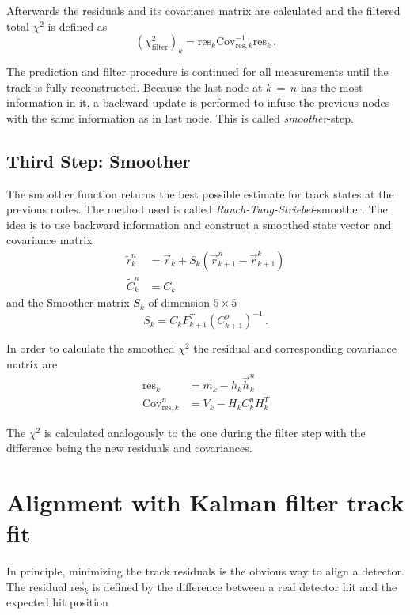 Afterwards the residuals and its covariance matrix are calculated and the filtered total $\chi^2$ is defined as
\begin{equation*}
  \left( \chi^2_{\text{filter}} \right)_k = \text{res}_k \text{Cov}_{\text{res},k}^{-1} \text{res}_k\,.
\end{equation*}

The prediction and filter procedure is continued for all measurements until the track is fully reconstructed.
Because the last node at $k \, = \, n$ has the most information in it, a backward update is performed to infuse the previous nodes with the same information as in last node.
This is called \textit{smoother}-step.

\subsection{Third Step: Smoother}
The smoother function returns the best possible estimate for track states at
the previous nodes. The method used is called \textit{Rauch-Tung-Striebel}-smoother\cite{RTS}.
The idea is to use backward information and construct a smoothed state vector and covariance matrix
\begin{align*}
  \tilde{r}_k^n &= \vec{r}_k + S_k \left( \vec{r}_{k+1}^n - \vec{r}_{k+1}^k \right) \\
  \tilde{C}_k^n &= C_k
\end{align*}
and the Smoother-matrix $S_k$ of dimension $5\times5$
\begin{equation*}
  S_k = C_k F_{k+1}^T \left( C_{k+1}^p \right)^{-1}\,.
\end{equation*}

In order to calculate the smoothed $\chi^2$ the residual and corresponding covariance matrix are
\begin{align*}
  \text{res}_k &= m_k - h_k \vec{h}_k^n \\
  \text{Cov}_{\text{res},k}^n &= V_k - H_k C_k^n H_k^T
\end{align*}

The $\chi^2$ is calculated analogously to the one during the filter step with the difference being the new residuals and covariances.

\section{Alignment with Kalman filter track fit}
\label{sec:derivatives}

In principle, minimizing the track residuals is the obvious way to align a detector.
The residual $\vec{\text{res}}_k$ is defined by the difference between a real detector hit and the expected hit position

